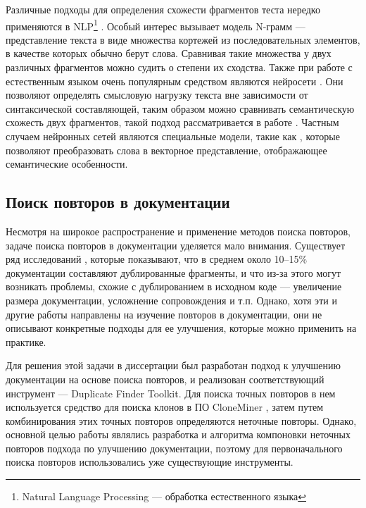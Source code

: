 \documentclass[14pt]{matmex-diploma-custom}
\begin{document}
Различные подходы для определения схожести фрагментов теста нередко применяются в NLP\footnote{Natural Language Processing --- обработка естественного языка} \cite{bib:art:NLP}. Особый интерес вызывает модель N-грамм \cite{bib:art:Ngram} --- представление текста в виде множества кортежей из последовательных элементов, в качестве которых обычно берут слова. Сравнивая такие множества у двух различных фрагментов можно судить о степени их сходства. Также при работе с естественным языком очень популярным средством являются нейросети \cite{bib:art:NeuralNetworks}. Они позволяют определять смысловую нагрузку текста вне зависимости от синтаксической составляющей, таким образом можно сравнивать семантическую схожесть двух фрагментов, такой подход рассматривается в работе \cite{bib:tool:NeuroDupDetect}. Частным случаем нейронных сетей являются специальные модели, такие как \cite{bib:tool:word2vec}, которые позволяют преобразовать слова в векторное представление, отображающее семантические особенности.

\subsection{Поиск повторов в документации}

Несмотря на широкое распространение и применение методов поиска повторов, задаче поиска повторов в документации уделяется мало внимания. Существует ряд исследований \cite{bib:art:JuergensCloneDetect, bib:art:DuplicatesStudy}, которые показывают, что в среднем около 10--15\% документации составляют дублированные фрагменты, и что из-за этого могут возникать проблемы, схожие с дублированием в исходном коде --- увеличение размера документации, усложнение сопровождения и т.п. Однако, хотя эти и другие работы направлены на изучение повторов в документации, они не описывают конкретные подходы для ее улучшения, которые можно применить на практике. 

Для решения этой задачи в диссертации \cite{bib:tool:DuplicateFinder} был разработан подход к улучшению документации  на основе поиска повторов, и реализован соответствующий инструмент --- Duplicate Finder Toolkit. Для поиска точных повторов в нем используется средство для поиска клонов в ПО CloneMiner \cite{bib:tool:CloneMiner}, затем путем комбинирования этих точных повторов определяются неточные повторы. Однако, основной целью работы являлись разработка и алгоритма компоновки неточных повторов подхода по улучшению документации, поэтому для первоначального поиска повторов использовались уже существующие инструменты.
\end{document}
